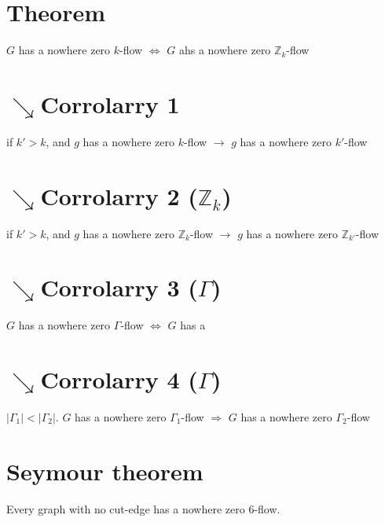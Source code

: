     \section{Theorem}
        $G$ has a nowhere zero $k$-flow $\Leftrightarrow$ $G$ ahs a nowhere zero $\mathbb{Z}_k$-flow
    \section{$\searrow$Corrolarry 1}
                if $k'>k$, and $g$ has a nowhere zero $k$-flow $\rightarrow$ $g$ has a nowhere zero $k'$-flow
    \section{$\searrow$Corrolarry 2 ($\mathbb{Z}_k$)}
        if $k'>k$, and $g$ has a nowhere zero $\mathbb{Z}_k$-flow $\rightarrow$ $g$ has a nowhere zero $\mathbb{Z}_{k'}$-flow
    \section{$\searrow$Corrolarry 3 ($\Gamma$)}
        $G$ has a nowhere zero $\Gamma$-flow $\Leftrightarrow$ $G$ has a 
    \section{$\searrow$Corrolarry 4 ($\Gamma$)}
        $|\Gamma_1|<|\Gamma_2|$. $G$ has a nowhere zero $\Gamma_1$-flow $\Rightarrow$ $G$ has a nowhere zero $\Gamma_2$-flow
    \section{Seymour theorem}
        Every graph with no cut-edge has a nowhere zero 6-flow.
